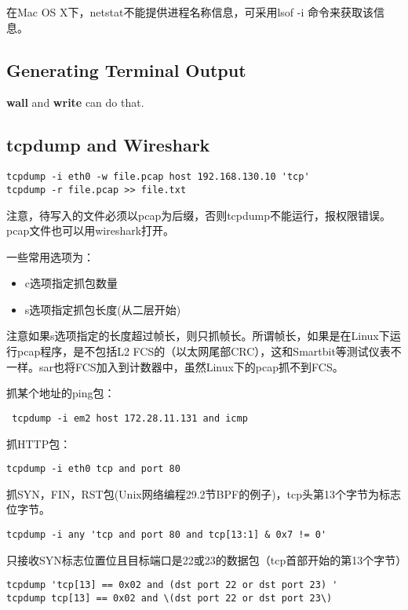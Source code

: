 在Mac OS X下，netstat不能提供进程名称信息，可采用lsof -i 命令来获取该信息。


\subsection{Generating Terminal Output}
\textbf{wall} and \textbf{write} can do that.

\subsection{tcpdump and Wireshark}

\begin{verbatim}
tcpdump -i eth0 -w file.pcap host 192.168.130.10 'tcp' 
tcpdump -r file.pcap >> file.txt
\end{verbatim}
注意，待写入的文件必须以pcap为后缀，否则tcpdump不能运行，报权限错误。pcap文件也可以用wireshark打开。

一些常用选项为：
\begin{itemize}
    \item 
        c选项指定抓包数量
    \item 
        s选项指定抓包长度(从二层开始)
\end{itemize}

注意如果s选项指定的长度超过帧长，则只抓帧长。所谓帧长，如果是在Linux下运行pcap程序，是不包括L2 FCS的（以太网尾部CRC），这和Smartbit等测试仪表不一样。sar也将FCS加入到计数器中，虽然Linux下的pcap抓不到FCS。

抓某个地址的ping包：
\begin{verbatim}
 tcpdump -i em2 host 172.28.11.131 and icmp
\end{verbatim}

抓HTTP包：
\begin{verbatim}
tcpdump -i eth0 tcp and port 80
\end{verbatim}

抓SYN，FIN，RST包(Unix网络编程29.2节BPF的例子)，tcp头第13个字节为标志位字节。
\begin{verbatim}
tcpdump -i any 'tcp and port 80 and tcp[13:1] & 0x7 != 0'
\end{verbatim}


只接收SYN标志位置位且目标端口是22或23的数据包（tcp首部开始的第13个字节）
\begin{verbatim}
tcpdump 'tcp[13] == 0x02 and (dst port 22 or dst port 23) '
tcpdump tcp[13] == 0x02 and \(dst port 22 or dst port 23\)
\end{verbatim}

